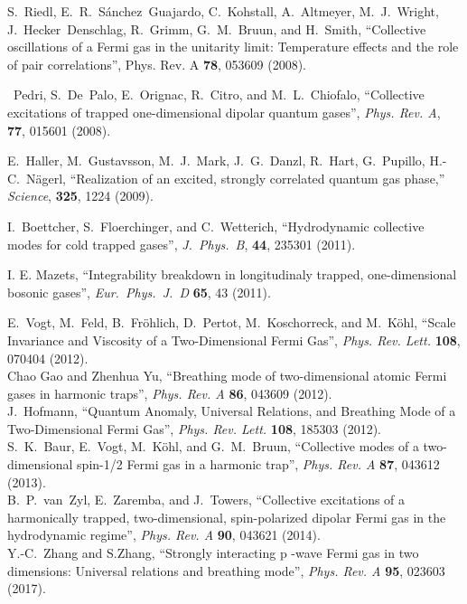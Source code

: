 \documentclass[a4paper, onecolumn]{revtex4-1}
\begin{document}
\begin{thebibliography}{1}
S.~Riedl, E.~R.~S\'anchez~Guajardo, C.~Kohstall, A.~Altmeyer, M.~J.~Wright, J.~Hecker~Denschlag,
R.~Grimm, G.~M.~Bruun, and H.~Smith, ``Collective oscillations of a Fermi gas in the unitarity
limit: Temperature effects and the role of pair correlations'', Phys. Rev. A {\bf 78}, 053609
(2008).

~Pedri, S.~De~Palo, E.~Orignac, R.~Citro, and M.~L.~Chiofalo, 
``Collective excitations of trapped one-dimensional dipolar quantum gases'', 
{\em Phys. Rev. A}, {\bf 77}, 015601 (2008).


 E.~Haller, M.~Gustavsson, M.~J.~Mark, J.~G.~Danzl, R.~Hart,
  G.~Pupillo, H.-C.~N\"agerl, ``Realization of an excited, strongly correlated quantum gas phase,''
  {\em Science}, \textbf{325}, 1224 (2009).



 I.~Boettcher, S.~Floerchinger, and C.~Wetterich, ``Hydrodynamic
  collective modes for cold trapped gases'', {\em J.~Phys.\ B}, \textbf{44}, 235301 (2011).


I. E. Mazets, ``Integrability breakdown in longitudinaly trapped, one-dimensional bosonic gases'', 
{\em Eur.~Phys.~J.~D} {\bf 65}, 43 (2011).


%

E.~Vogt, M.~Feld, B.~Fr\"ohlich, D.~Pertot, M.~Koschorreck, and M.~K\"ohl, ``Scale Invariance and
Viscosity of a Two-Dimensional Fermi Gas'', {\em Phys. Rev. Lett.} {\bf 108}, 070404 (2012).
%
\\ 
%
Chao Gao and Zhenhua Yu, ``Breathing mode of two-dimensional atomic Fermi gases in harmonic traps'',
{\em Phys. Rev. A} {\bf 86}, 043609 (2012).
%
\\ 
%
J.~Hofmann, ``Quantum Anomaly, Universal Relations, and Breathing Mode of a Two-Dimensional Fermi
Gas'', {\em Phys. Rev. Lett.} {\bf 108}, 185303 (2012).
%
\\ 
%
S.~K.~Baur, E.~Vogt, M.~K\"ohl, and G.~M.~Bruun, ``Collective modes of a two-dimensional spin-1/2
Fermi gas in a harmonic trap'', {\em Phys. Rev. A} {\bf 87}, 043612 (2013).
%
\\ 
%
B.~P.~van~Zyl, E.~Zaremba, and J.~Towers,
``Collective excitations of a harmonically trapped, two-dimensional, spin-polarized dipolar Fermi
gas in the hydrodynamic regime'', 
{\em Phys. Rev. A} {\bf 90}, 043621 (2014). 
%
\\ 
%
Y.-C.~Zhang and S.Zhang, ``Strongly interacting p -wave Fermi gas in two dimensions:
Universal relations and breathing mode'', {\em Phys. Rev. A} {\bf 95}, 023603 (2017).



\end{thebibliography}
\end{document}
